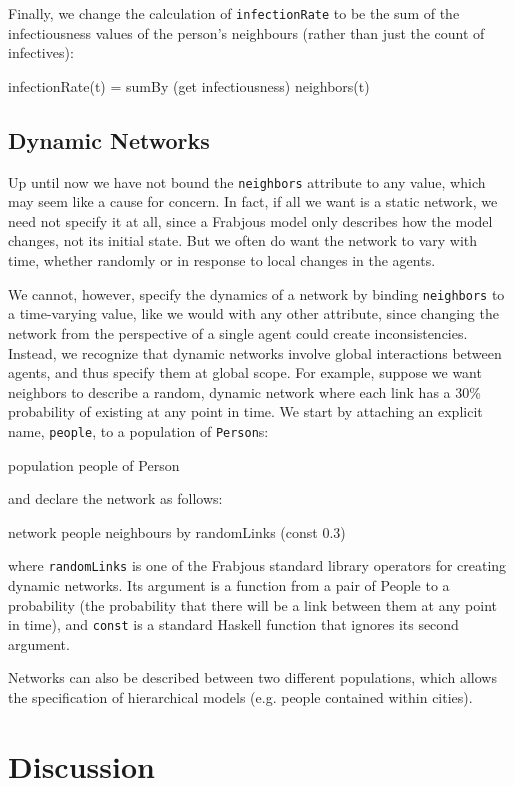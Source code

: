 \documentclass{llncs}
\begin{document}
 Finally, we change the calculation of \lstinline{infectionRate} to be the sum of the infectiousness values of the person's neighbours (rather than just the count of infectives): 
\begin{code}
infectionRate(t) = sumBy (get infectiousness) neighbors(t) 
\end{code}
\subsection{Dynamic Networks	}

 Up until now we have not bound the \lstinline{neighbors} attribute to any value, which may seem like a cause for concern. In fact, if all we want is a static network, we need not specify it at all, since a Frabjous model only describes how the model changes, not its initial state. But we often do want the network to vary with time, whether randomly or in response to local changes in the agents. 

  We cannot, however, specify the dynamics of a network by binding \lstinline{neighbors} to a time-varying value, like we would with any other attribute, since changing the network from the perspective of a single agent could create inconsistencies. Instead, we recognize that dynamic networks involve global interactions between agents, and thus specify them at global scope. 
   For example, suppose we want neighbors to describe a random, dynamic network where each link has a 30\% probability of existing at any point in time. We start by attaching an explicit name, \lstinline{people}, to a population of \lstinline{Person}s: 
\begin{code}
population people of Person
\end{code}
and declare the network as follows:
\begin{code}
network people neighbours by randomLinks (const 0.3)
\end{code}
where \lstinline{randomLinks} is one of the Frabjous standard library operators for creating dynamic networks. Its argument is a function from a pair of People to a probability (the probability that there will be a link between them at any point in time), and \lstinline{const} is a standard Haskell function that ignores its second argument. 

Networks can also be described between two different populations, which allows the specification of hierarchical models (e.g. people contained within cities).  

\section{Discussion }
\end{document}
